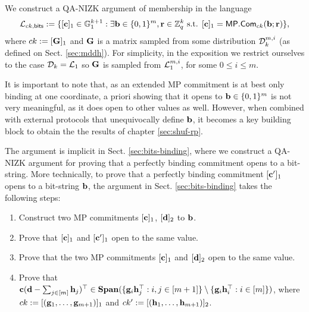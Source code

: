 We construct a QA-NIZK argument of membership in the language
$$
\mathcal{L}_{ck,\mathsf{bits}} := \{[\mathbf{c}]_1\in\mathbb{G}_1^{k+1} : \exists \mathbf{b}\in\{0,1\}^m,\mathbf{r}\in\mathbb{Z}_q^k \text{ s.t. } [\mathbf{c}]_1 = \mathsf{MP}.\mathsf{Com}_{ck}(\mathbf{b};\mathbf{r})\},
$$
where $ck:=[\mathbf{{G}}]_1$ and $\mathbf{{G}}$ is a matrix sampled from 
some distribution $\mathcal{D}_k^{m,i}$ (as defined on Sect. \ref{sec:mddh}). For simplicity, in the exposition we restrict ourselves to the case $\mathcal{D}_k=\mathcal{L}_{1}$ so  $\mathbf{{G}}$ is sampled from $\mathcal{L}_1^{m,i}$, for some $0 \leq i \leq m$.

It is important to note that, as an extended MP commitment is at best only binding at one coordinate, a priori showing that it opens to $\mathbf{b} \in \{0,1\}^m$ is not very meaningful, as it does open to other values as well. However, when combined with external protocols that unequivocally define $\mathbf{b}$, it becomes a key building block to obtain the the results of chapter \ref{sec:shuf-rp}.

The argument is implicit in Sect. \ref{sec:bits-binding}, where we construct a QA-NIZK argument for proving that a perfectly binding commitment opens to a bit-string. More technically, to prove that a  perfectly binding commitment $[\mathbf{c}']_1$ opens to a bit-string $\mathbf{b}$, the argument in Sect. \ref{sec:bits-binding} takes the following steps:
\begin{enumerate}
\item Construct two MP commitments $[\mathbf{c}]_1$, 
$[\mathbf{d}]_2$ to $\mathbf{b}$. 
\item Prove that $[\mathbf{c}]_1$ and $[\mathbf{c}']_1$ open to the same value. 
\item Prove that the two MP commitments $[\mathbf{c}]_1$ and $[\mathbf{d}]_2$ open to the same value.
\item Prove that $\mathbf{c}(\mathbf{d}-\sum_{j \in [m]}
\mathbf{h}_j)^\top\in\mathbf{Span}(\{\mathbf{g}_i\mathbf{h}_j^\top:i,j\in[m+1]\}\setminus\{\mathbf{g}_i\mathbf{h}_i^\top:i\in[m]\})$, where $ck:=[(\mathbf{g}_1,\ldots,\mathbf{g}_{m+1})]_1$ and $ck':=[(\mathbf{h}_1,\ldots,\mathbf{h}_{m+1})]_2$.
\end{enumerate}


